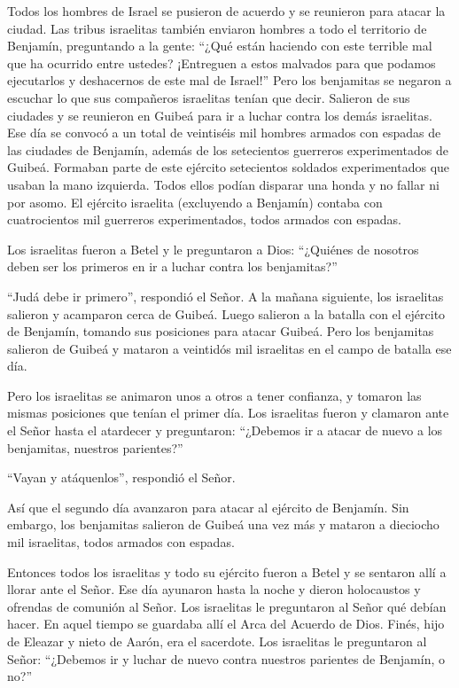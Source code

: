  Todos los hombres de Israel se pusieron de acuerdo y se
reunieron para atacar la ciudad.  Las tribus israelitas
también enviaron hombres a todo el territorio de Benjamín, preguntando a
la gente: ``¿Qué están haciendo con este terrible mal que ha ocurrido
entre ustedes?  ¡Entreguen a estos malvados para que
podamos ejecutarlos y deshacernos de este mal de Israel!'' Pero los
benjamitas se negaron a escuchar lo que sus compañeros israelitas tenían
que decir.  Salieron de sus ciudades y se reunieron en
Guibeá para ir a luchar contra los demás israelitas.  Ese
día se convocó a un total de veintiséis mil hombres armados con espadas
de las ciudades de Benjamín, además de los setecientos guerreros
experimentados de Guibeá.  Formaban parte de este ejército
setecientos soldados experimentados que usaban la mano izquierda. Todos
ellos podían disparar una honda y no fallar ni por asomo. 
El ejército israelita (excluyendo a Benjamín) contaba con cuatrocientos
mil guerreros experimentados, todos armados con espadas.

 Los israelitas fueron a Betel y le preguntaron a Dios:
``¿Quiénes de nosotros deben ser los primeros en ir a luchar contra los
benjamitas?''

``Judá debe ir primero'', respondió el Señor.  A la mañana
siguiente, los israelitas salieron y acamparon cerca de Guibeá.
 Luego salieron a la batalla con el ejército de Benjamín,
tomando sus posiciones para atacar Guibeá.  Pero los
benjamitas salieron de Guibeá y mataron a veintidós mil israelitas en el
campo de batalla ese día.

 Pero los israelitas se animaron unos a otros a tener
confianza, y tomaron las mismas posiciones que tenían el primer día.
 Los israelitas fueron y clamaron ante el Señor hasta el
atardecer y preguntaron: ``¿Debemos ir a atacar de nuevo a los
benjamitas, nuestros parientes?''

``Vayan y atáquenlos'', respondió el Señor.

 Así que el segundo día avanzaron para atacar al ejército
de Benjamín.  Sin embargo, los benjamitas salieron de
Guibeá una vez más y mataron a dieciocho mil israelitas, todos armados
con espadas.

 Entonces todos los israelitas y todo su ejército fueron a
Betel y se sentaron allí a llorar ante el Señor. Ese día ayunaron hasta
la noche y dieron holocaustos y ofrendas de comunión al Señor.
 Los israelitas le preguntaron al Señor qué debían hacer.
En aquel tiempo se guardaba allí el Arca del Acuerdo de Dios.
 Finés, hijo de Eleazar y nieto de Aarón, era el sacerdote.
Los israelitas le preguntaron al Señor: ``¿Debemos ir y luchar de nuevo
contra nuestros parientes de Benjamín, o no?''


